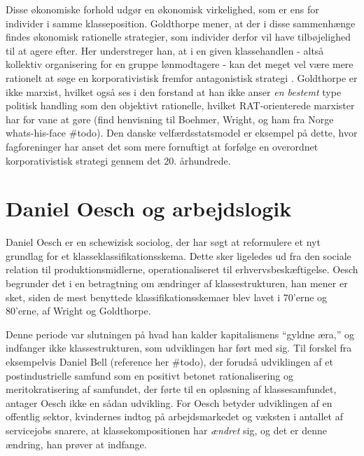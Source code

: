 Disse økonomiske forhold udgør en økonomisk virkelighed, som er ens for individer i samme klasseposition. Goldthorpe mener, at der i disse sammenhænge findes økonomisk rationelle strategier, som individer derfor vil have tilbøjelighed til at agere efter. Her understreger han, at i en given klassehandlen - altså kollektiv organisering for en gruppe lønmodtagere - kan det meget vel være mere rationelt at søge en korporativistisk fremfor antagonistisk strategi \parencite[215]{Goldthorpe2002}. Goldthorpe er ikke marxist, hvilket også ses i den forstand at han ikke anser \emph{en bestemt} type politisk handling som den objektivt rationelle, hvilket RAT-orienterede marxister har for vane at gøre (find henvisning til Boehmer, Wright, og ham fra Norge whats-his-face \#todo). Den danske velfærdsstatsmodel er eksempel på dette, hvor fagforeninger har anset det som mere fornuftigt at forfølge en overordnet korporativistisk strategi gennem det 20. århundrede. %

\section{Daniel Oesch og arbejdslogik  \label{sec_}}

Daniel Oesch er en schewizisk sociolog, der har søgt at reformulere et nyt grundlag for et klasseklassifikationsskema. Dette sker ligeledes ud fra den sociale relation til produktionsmidlerne, operationaliseret til erhvervsbeskæftigelse. Oesch begrunder det i en betragtning om ændringer af klassestrukturen, han mener er sket, siden de mest benyttede klassifikationsskemaer blev lavet i 70'erne og 80'erne, af Wright og Goldthorpe. 

Denne periode var slutningen på hvad han kalder kapitalismens “gyldne æra,” og indfanger ikke klassestrukturen, som udviklingen har ført med sig. Til forskel fra eksempelvis Daniel Bell (reference her \#todo), der forudså udviklingen af et postindustrielle samfund som en positivt betonet rationalisering og meritokratisering af samfundet, der førte til en opløsning af klassesamfundet, antager Oesch ikke en sådan udvikling. For Oesch betyder udviklingen af en offentlig sektor, kvindernes indtog på arbejdsmarkedet og  væksten i antallet af servicejobs snarere, at klassekompositionen har \emph{ændret} sig, og det er denne ændring, han prøver at indfange. 

